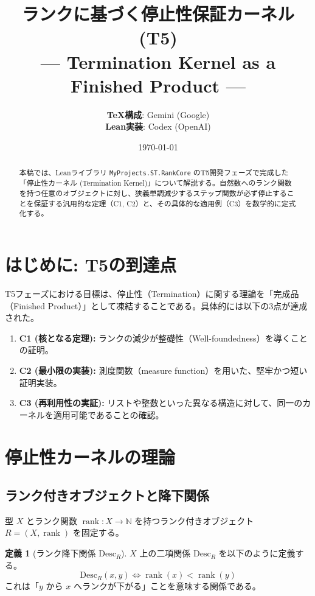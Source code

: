 \documentclass[a4paper,11pt]{article}
\title{\textbf{ランクに基づく停止性保証カーネル (T5)}\\ \large --- Termination Kernel as a Finished Product ---}
\author{
    \textbf{TeX構成}: Gemini (Google) \\
    \textbf{Lean実装}: Codex (OpenAI)
}
\date{\today}
\theoremstyle{definition}
\newtheorem{definition}{定義}[section]
\theoremstyle{plain}
\newcommand{\code}[1]{\texttt{#1}}
\newcommand{\rank}{\operatorname{rank}}
\newcommand{\Desc}{\mathrm{Desc}}
\newcommand{\N}{\mathbb{N}}
\begin{document}
\maketitle

\begin{abstract}
本稿では、Leanライブラリ \code{MyProjects.ST.RankCore} のT5開発フェーズで完成した「停止性カーネル (Termination Kernel)」について解説する。自然数へのランク関数を持つ任意のオブジェクトに対し、狭義単調減少するステップ関数が必ず停止することを保証する汎用的な定理（C1, C2）と、その具体的な適用例（C3）を数学的に定式化する。
\end{abstract}

\tableofcontents

\section{はじめに: T5の到達点}
T5フェーズにおける目標は、停止性（Termination）に関する理論を「完成品（Finished Product）」として凍結することである。具体的には以下の3点が達成された。

\begin{enumerate}
    \item \textbf{C1 (核となる定理):} ランクの減少が整礎性（Well-foundedness）を導くことの証明。
    \item \textbf{C2 (最小限の実装):} 測度関数（measure function）を用いた、堅牢かつ短い証明実装。
    \item \textbf{C3 (再利用性の実証):} リストや整数といった異なる構造に対して、同一のカーネルを適用可能であることの確認。
\end{enumerate}

\section{停止性カーネルの理論}

\subsection{ランク付きオブジェクトと降下関係}

型 $X$ とランク関数 $\rank: X \to \N$ を持つランク付きオブジェクト $R = (X, \rank)$ を固定する。

\begin{definition}[ランク降下関係 $\Desc_R$]
$X$ 上の二項関係 $\Desc_R$ を以下のように定義する。
\[ \Desc_R(x, y) \iff \rank(x) < \rank(y) \]
これは「$y$ から $x$ へランクが下がる」ことを意味する関係である。
\end{definition}
\end{document}

